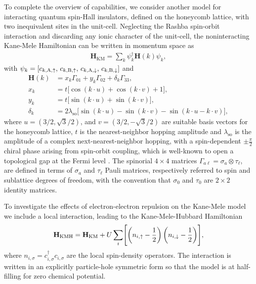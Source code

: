 \documentclass[edipack_sp.tex]{subfiles}
\begin{document}
To complete the overview of \NAME capabilities, we consider another
model for interacting quantum spin-Hall insulators, defined on the honeycomb lattice, with two inequivalent sites in the unit-cell. Neglecting the Rashba spin-orbit interaction and discarding any ionic character of the unit-cell, the noninteracting Kane-Mele Hamiltonian \cite{Kane2005PRLa,Kane2005PRL} can be written in momentum space as
\begin{align*}
    \mathbf{H}_\mathrm{KM} = \sum_{{k}} \psi^\dagger_{{k}} \mathbf{H}({k}) \psi_{{k}},
\end{align*}
with $\psi_{{k}} = [c_{{k},\mathrm{A},\uparrow},\,c_{{k},\mathrm{B},\uparrow},\,c_{{k},\mathrm{A},\downarrow},\,c_{{k},\mathrm{B},\downarrow}]$ and
    \begin{align}
    \mathbf{H}({k}) 
    &= x_{{k}}\Gamma_{01} + y_{{k}}\Gamma_{02} + \delta_{{k}}\Gamma_{33}, \label{eq:Hk_kanemele}\\[1mm]
   x_{{k}}&=t\bigl[\cos({k}\cdot{u})+\cos({k}\cdot{v})+1\bigr],\nonumber\\
   y_{{k}}&=t\bigl[\sin({k}\cdot{u})+\sin({k}\cdot{v})\bigr],\nonumber \\
   \delta_{{k}}&=2\lambda_\mathrm{so}\bigl[\sin({k}\cdot{u})-\sin({k}\cdot{v}) - \sin({k}\cdot{u} -{k}\cdot{v})\bigr], \nonumber
\end{align}
where ${u} = (3/2, \sqrt{3}/2)$, and ${v} = (3/2, -\sqrt{3}/2)$
are suitable basis vectors for the honeycomb lattice, $t$ is the
nearest-neighbor hopping amplitude and $\lambda_\mathrm{so}$ is 
the amplitude of a complex next-nearest-neighbor hopping,
with a spin-dependent $\pm\tfrac{\pi}{2}$ chiral phase arising from spin-orbit coupling, which is well-known to open a topological gap at the Fermi level \cite{Kane2005PRLa,Kane2005PRL}.
The spinorial $4\times4$ matrices $\Gamma_{a\ell} = \sigma_a\otimes\tau_\ell$, are 
defined in terms of $\sigma_a$ and $\tau_\ell$ Pauli matrices, respectively 
referred to spin and sublattice degrees of freedom, with the convention that 
$\sigma_0$ and $\tau_0$ are $2\times2$ identity matrices.

To investigate the effects of electron-electron repulsion on the
Kane-Mele model we include a local interaction, 
leading to the Kane-Mele-Hubbard Hamiltonian \cite{Hohenadler2013ROPIP,Rachel2018ROPIP}
\begin{equation}
    \mathbf{H}_\mathrm{KMH} = \mathbf{H}_\mathrm{KM} 
    + U\sum_{i}\Biggl[
                        \left(n_{i,\uparrow} - \frac{1}{2}\right)
                        \left(n_{i,\downarrow} - \frac{1}{2}\right)
                      \Biggr],
    \label{eq:KMHmodel}
\end{equation}
where $n_{i,\sigma}=c^\dagger_{i,\sigma}c_{i,\sigma}$ are the 
local spin-density operators. The interaction is written in an explicitly 
particle-hole symmetric form so that the model is at half-filling for zero
chemical potential.
\end{document}
